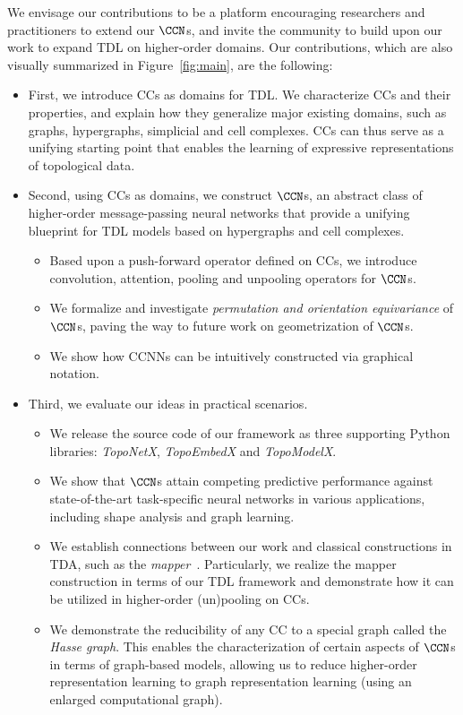 We envisage our contributions to be a platform encouraging researchers and practitioners to extend our $\CCN$s, and invite the community to build upon our work to expand TDL on higher-order domains.
Our contributions, which are also visually summarized in Figure~\ref{fig:main}, are the following:

\begin{itemize}[topsep=1pt]
\setlength\itemsep{0.1pt}
\item First, we introduce CCs as domains for TDL. We characterize CCs and their properties, and explain how
they generalize major existing domains, such as graphs, hypergraphs, simplicial and cell complexes. CCs can thus serve as a unifying starting point that enables the learning of expressive representations of topological data. 
\item Second, using CCs as domains, we construct $\CCN$s, an abstract class of higher-order message-passing neural networks that provide a unifying blueprint for TDL models based on hypergraphs and cell complexes. 
\begin{itemize}[topsep=1pt]
\setlength\itemsep{0.1pt}
    \item Based upon a push-forward operator defined on CCs, we introduce convolution, attention, pooling and unpooling operators for $\CCN$s. 
    \item We formalize and investigate \emph{permutation and orientation equivariance} of $\CCN$s, paving the way to future work on geometrization of $\CCN$s.
    \item We show how CCNNs can be intuitively constructed via graphical notation.
\end{itemize}
\item Third, we evaluate our ideas in practical scenarios.
\begin{itemize}[topsep=1pt,noitemsep]
    \item We release the source code of our framework as three supporting Python libraries: \emph{TopoNetX}, \emph{TopoEmbedX} and \emph{TopoModelX}.
    \item We show that $\CCN$s attain competing predictive performance against state-of-the-art task-specific neural networks in various applications, including shape analysis and graph learning. 
    \item We establish connections between our work and classical constructions in TDA, such as the \emph{mapper}~\cite{singh2007topological}. Particularly, we realize the mapper construction in terms of our TDL framework and demonstrate how it can be utilized in higher-order (un)pooling on CCs.
    \item  We demonstrate the reducibility of any CC to a special graph called the \emph{Hasse graph}. This enables the characterization of certain aspects of $\CCN$s in terms of graph-based models, allowing us to reduce higher-order representation learning to graph representation learning (using an enlarged computational graph).
\end{itemize}
\end{itemize}

